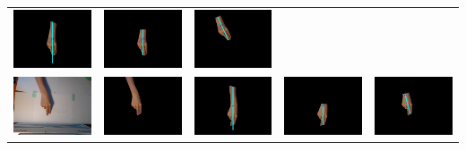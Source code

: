 \begin{tabular}{lllll}
\includegraphics[width=3.5cm]{fig4/2-c.png} &
\includegraphics[width=3.5cm]{fig4/2-d.png} &
\includegraphics[width=3.5cm]{fig4/2-e.png} \\
\includegraphics[width=3.5cm]{fig4/3-a.png} &
\includegraphics[width=3.5cm]{fig4/3-b.png} &
\includegraphics[width=3.5cm]{fig4/3-c.png} &
\includegraphics[width=3.5cm]{fig4/3-d.png} &
\includegraphics[width=3.5cm]{fig4/3-e.png}
\end{tabular}
